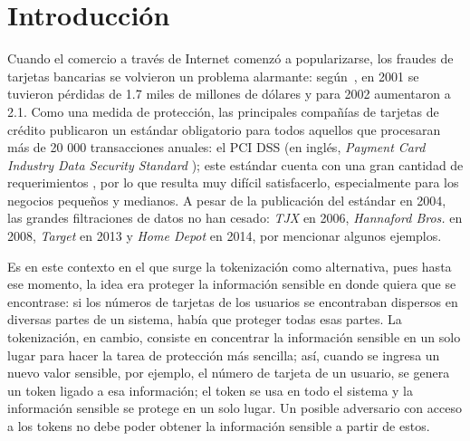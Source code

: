 %
%

\section{Introducción}


Cuando el comercio a través de Internet comenzó a popularizarse, los fraudes de
tarjetas bancarias se volvieron un problema alarmante: según~\cite{wallethub},
en 2001 se tuvieron pérdidas de 1.7 miles de millones de dólares y para 2002
aumentaron a 2.1. Como una medida de protección, las principales compañías de
tarjetas de crédito publicaron un estándar obligatorio para todos aquellos que
procesaran más de 20 000 transacciones anuales: el PCI DSS (en inglés,
\textit{Payment Card Industry Data Security Standard} \cite{pci_dss}); este
estándar cuenta con una gran cantidad de requerimientos \cite{search_security,
uk_association}, por lo que resulta muy difícil satisfacerlo,
especialmente para los negocios pequeños y medianos. A pesar de la publicación
del estándar en 2004, las grandes filtraciones de datos no han cesado:
\textit{TJX} en 2006, \textit{Hannaford Bros.} en 2008, \textit{Target} en
2013 y \textit{Home Depot} en 2014, por mencionar algunos ejemplos.


Es en este contexto en el que surge la tokenización como alternativa, pues hasta
ese momento, la idea era proteger la información sensible en donde
quiera que se encontrase: si los números de tarjetas de los usuarios se
encontraban dispersos en diversas partes de un sistema, había que proteger todas
esas partes. La tokenización, en cambio, consiste en concentrar la información
sensible en un solo lugar para hacer la tarea de protección más sencilla; así,
cuando se ingresa un nuevo valor sensible, por ejemplo, el número de tarjeta
de un usuario, se genera un token ligado a esa información; el token se usa en
todo el sistema y la información sensible se protege en un solo lugar. Un
posible adversario con acceso a los tokens no debe poder obtener la información
sensible a partir de estos.

